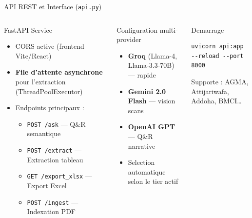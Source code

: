 \documentclass[aspectratio=169, 10pt]{beamer}
\begin{document}
\begin{frame}{API REST et Interface (\texttt{api.py})}
  \begin{columns}[T]
      \begin{block}{FastAPI Service}
        \begin{itemize}\small
          \item CORS active (frontend Vite/React)
          \item \textbf{File d'attente asynchrone} pour l'extraction
                (ThreadPoolExecutor)
          \item Endpoints principaux :
                \begin{itemize}\scriptsize
                  \item \texttt{POST /ask} --- Q\&R semantique
                  \item \texttt{POST /extract} --- Extraction tableau
                  \item \texttt{GET /export\_xlsx} --- Export Excel
                  \item \texttt{POST /ingest} --- Indexation PDF
                \end{itemize}
        \end{itemize}
      \end{block}

      \begin{block}{Configuration multi-provider}
        \begin{itemize}\small
          \item \textbf{Groq} (Llama-4, Llama-3.3-70B) --- rapide
          \item \textbf{Gemini 2.0 Flash} --- vision scans
          \item \textbf{OpenAI GPT} --- Q\&R narrative
          \item Selection automatique selon le tier actif
        \end{itemize}
      \end{block}

      \begin{block}{Demarrage}
        \begin{lstlisting}
uvicorn api:app --reload --port 8000
        \end{lstlisting}
        \small Supporte : AGMA, Attijariwafa,\\Addoha, BMCI\ldots
      \end{block}
  \end{columns}
\end{frame}
\end{document}
